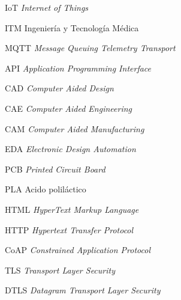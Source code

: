
%
%

            {IoT} %
            {\textit{Internet of Things}} %
            
            {ITM} %
            {Ingeniería y Tecnología Médica} %
            
            {MQTT} %
            {\textit{Message Queuing Telemetry Transport}} %

            {API} %
            {\textit{Application Programming Interface}} %

            {CAD} %
            {\textit{Computer Aided Design}} %

            {CAE} %
            {\textit{Computer Aided Engineering}} %

            {CAM} %
            {\textit{Computer Aided Manufacturing}} %

            {EDA} %
            {\textit{Electronic Design Automation}} %
            
            {PCB} %
            {\textit{Printed Circuit Board}} %
            
            {PLA} %
            {Acido poliláctico} %

            {HTML} %
            {\textit{HyperText Markup Language}} %

            {HTTP} %
            {\textit{Hypertext Transfer Protocol}} %

            {CoAP} %
            {\textit{Constrained Application Protocol}} %
            
            {TLS} %
            {\textit{Transport Layer Security}} %

            {DTLS} %
            {\textit{Datagram Transport Layer Security}} %
            
